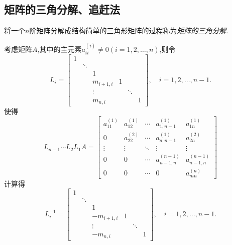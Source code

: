 \documentclass[a4paper,cs4size,adobefonts,fancyhdr]{ctexart}[2005/11/25]
\newcommand{\upcite}[1]{\textsuperscript{\textsuperscript{\cite{#1}}}}
\begin{document}
\subsection{矩阵的三角分解、追赶法}
将一个$n$阶矩阵分解成结构简单的三角形矩阵的过程称为\emph{矩阵的三角分解}\upcite{Apel2007}.\par
考虑矩阵$A$,其中的主元素$a_{ii}^{(i)}\not=0(i=1,2,\ldots,n)$,则令
\begin{equation}
L_i=\begin{bmatrix}
   1 &  \\
     & \ddots & \\
     &        &  1  & \\
     &	      & m_{i+1,i} & 1 & \\
     &        & \vdots    &   &  \ddots & \\
     &	      & m_{n,i}   &   &         &  1 
  \end{bmatrix}
  ,\quad i=1,2,\ldots,n-1.
\end{equation}
使得
\begin{equation}\label{eq:01_zgf_mt}
 L_{n-1}\cdots L_2 L_1 A=\begin{bmatrix}
                         a_11^{(1)}  &  a_12^{(1)}  &  \cdots & a_{1,n-1}^{(1)}    & a_{1n}^{(1)} \\
                         0           &  a_22^{(2)}  &  \cdots & a_{a,n-1}^{(1)}    & a_{2n}^{(2)} \\
                         \vdots      &  \vdots      &  \ddots &  \vdots            &   \vdots     \\
                         0           &    0         &  \cdots &  a_{n-1,n}^{(n-1)} & a_{n-1,n}^{(n-1)} \\
                         0           &    0         &  \cdots &     0              &    a_{mn}^{(n)}                    
                         \end{bmatrix}
\end{equation}
计算得
\begin{equation}
L_i^{-1}=\begin{bmatrix}
   1 &  \\
     & \ddots & \\
     &        &  1  & \\
     &	      & -m_{i+1,i} & 1 & \\
     &        & \vdots    &   &  \ddots & \\
     &	      & -m_{n,i}   &   &         &  1 
  \end{bmatrix}
  ,\quad i=1,2,\ldots,n-1.
\end{equation}
\end{document}

